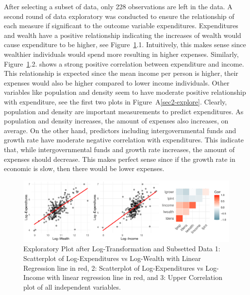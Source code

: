 \documentclass[11pt]{article}\usepackage[]{graphicx}\usepackage[]{color}
\makeatletter
\def\maxwidth{ %
  \ifdim\Gin@nat@width>\linewidth
    \linewidth
  \else
    \Gin@nat@width
  \fi
}
\makeatother
\begin{document}
\noindent After selecting a subset of data, only 228 observations are left in the data. A second round of data exploratory was conducted to ensure the relationship of each measure if significant to the outcome variable expenditures. Expenditures and wealth have a positive relationship indicating the increases of wealth would cause expenditure to be higher, see Figure~\ref{sec-explore}.1. Intuitively, this makes sense since wealthier individuals would spend more resulting in higher expenses. Similarly, Figure~\ref{sec-explore}.2. shows a strong positive correlation between expenditure and income. This relationship is expected since the mean income per person is higher, their expenses would also be higher compared to lower income individuals. Other variables like population and density seem to have moderate positive relationship with expenditure, see the first two plots in Figure~A\ref{sec2-explore}. Clearly, population and density are important measurements to predict expenditures. As population and density increases, the amount of expenses also increases, on average. On the other hand, predictors including intergovernmental funds and growth rate have moderate negative correlation with expenditures. This indicate that, while intergovernmental funds and growth rate increases, the amount of expenses should decrease. This makes perfect sense since if the growth rate in economic is slow, then there would be lower expenses.             

\begin{figure}[h!] 
\begin{center}

\includegraphics[width=\maxwidth]{figure/unnamed-chunk-3-1} 

\caption{Exploratory Plot after Log-Transformation and Subsetted Data 1: Scatterplot of Log-Expenditures vs Log-Wealth with Linear Regression line in red, 2: Scatterplot of Log-Expenditures vs Log-Income with linear regression line in red, and 3: Upper Correlation plot of all independent variables.}
\label{sec-explore}
\end{center} 
\end{figure}
\end{document}
